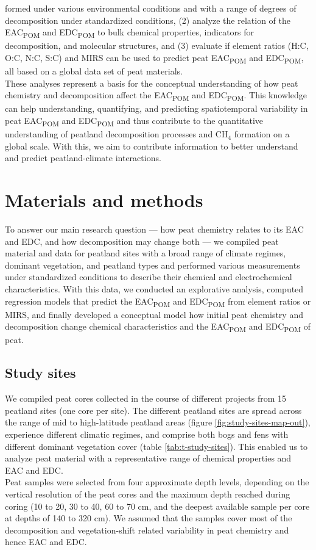 \documentclass[draft,linenumbers]{agujournal2018}
\begin{document}
formed under various environmental conditions and with a range of
degrees of decomposition under standardized conditions, (2) analyze the
relation of the EAC\textsubscript{POM} and EDC\textsubscript{POM} to
bulk chemical properties, indicators for decomposition, and molecular
structures, and (3) evaluate if element ratios (H:C, O:C, N:C, S:C) and
MIRS can be used to predict peat EAC\textsubscript{POM} and
EDC\textsubscript{POM}, all based on a global data set of peat
materials.\\
These analyses represent a basis for the conceptual understanding of how
peat chemistry and decomposition affect the EAC\textsubscript{POM} and
EDC\textsubscript{POM}. This knowledge can help understanding,
quantifying, and predicting spatiotemporal variability in peat
EAC\textsubscript{POM} and EDC\textsubscript{POM} and thus contribute to
the quantitative understanding of peatland decomposition processes and
CH\(_4\) formation on a global scale. With this, we aim to contribute
information to better understand and predict peatland-climate
interactions.

\section{Materials and methods}

To answer our main research question --- how peat chemistry relates to
its EAC and EDC, and how decomposition may change both --- we compiled
peat material and data for peatland sites with a broad range of climate
regimes, dominant vegetation, and peatland types and performed various
measurements under standardized conditions to describe their chemical
and electrochemical characteristics. With this data, we conducted an
explorative analysis, computed regression models that predict the
EAC\textsubscript{POM} and EDC\textsubscript{POM} from element ratios or
MIRS, and finally developed a conceptual model how initial peat
chemistry and decomposition change chemical characteristics and the
EAC\textsubscript{POM} and EDC\textsubscript{POM} of peat.

\subsection{Study sites}

We compiled peat cores collected in the course of different projects
from 15 peatland sites (one core per site). The different peatland sites
are spread across the range of mid to high-latitude peatland areas
(figure \ref{fig:study-sites-map-out}), experience different climatic
regimes, and comprise both bogs and fens with different dominant
vegetation cover (table \ref{tab:t-study-sites}). This enabled us to
analyze peat material with a representative range of chemical properties
and EAC and EDC.\\
Peat samples were selected from four approximate depth levels, depending
on the vertical resolution of the peat cores and the maximum depth
reached during coring (10 to 20, 30 to 40, 60 to 70 cm, and the deepest
available sample per core at depths of 140 to 320 cm). We assumed that
the samples cover most of the decomposition and vegetation-shift related
variability in peat chemistry and hence EAC and EDC.
\end{document}
